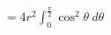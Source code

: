 \documentclass[preview]{standalone}
\begin{document}
\begin{align*}
=4r^{2}\int_{0}^{\frac{\pi}{2}}\cos^{2}\theta\ d\theta
\end{align*}
\end{document}
